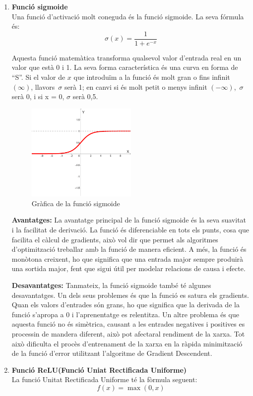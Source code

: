 \begin{enumerate}
 \item \textbf{Funció sigmoide}\\
 Una funció d'activació molt coneguda és la funció sigmoide. La seva fórmula és:
\[ \sigma(x) = \frac{1}{1 + e^{-x}} \]

Aquesta funció matemàtica transforma qualsevol valor d'entrada real en un valor que està 0 i 1. La seva forma característica és una curva en forma de ``S''. Si el valor de $x$ que introduïm a la funció és molt gran o fins infinit $(\infty)$, llavors\ $\sigma$ serà 1; en canvi si és molt petit o menys infinit $(-\infty)$,\ $\sigma$ serà 0, i si x = 0,  $\sigma$  serà 0,5.

\begin{figure}[h!]
    \centering
    \includegraphics[width=0.5\textwidth]{./figures/grafica_sigmoide.png}
    \caption{Gràfica de la funció sigmoide}
\end{figure}

\textbf{Avantatges:}
La avantatge principal de la funció sigmoide és la seva suavitat i la facilitat de derivació. La funció és diferenciable en tots els punts, cosa que facilita el càlcul de gradients, això vol dir que permet als algoritmes d'optimització treballar amb la funció de manera eficient. A més, la funció és monòtona creixent, ho que significa que una entrada major sempre produirà una sortida major, fent que sigui útil per modelar relacions de causa i efecte.

\textbf{Desavantatges:}
Tanmateix, la funció sigmoide també té algunes desavantatges. Un dels seus problemes és que la funció es satura els gradients. Quan els valors d'entrades són grans, ho que significa que la derivada de la funció s'apropa a 0 i l'aprenentatge es relentitza. Un altre problema és que aquesta funció no és simètrica, causant a les entrades negatives i positives es processin de mandera diferent, això pot afectaral rendiment de la xarxa. Tot això dificulta el procès d'entrenament de la xarxa en la ràpida minimització de la funció d'error utilitzant l'algoritme de Gradient Descendent.
\item \textbf{Funció ReLU(Funció Uniat Rectificada Uniforme)}\\
La funció Unitat Rectificada Uniforme té la fòrmula seguent:
\[ f(x) = \max(0, x) \]


\end{enumerate}
